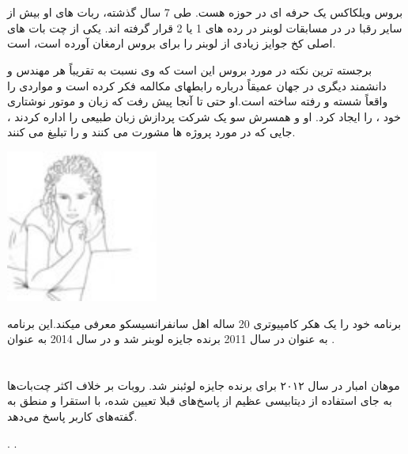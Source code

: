 \documentclass[18pt,a4paper]{report}
\begin{document}
 \section{}
 بروس ویلکاکس یک حرفه ای در حوزه  هست. طی 7 سال گذشته، ربات های او بیش از سایر رقبا در در مسابقات لوبنر در رده های 1 یا 2 قرار گرفته اند. یکی از چت بات های اصلی کخ جوایز زیادی از لوبنر را برای بروس ارمغان آورده است،  است.
 
 برجسته ترین نکته در مورد بروس این است که وی نسبت به تقریباً هر مهندس و دانشمند دیگری در جهان عمیقاً درباره رابطهای مکالمه فکر کرده است و مواردی را واقعاً شسته و رفته ساخته است.او حتی تا آنجا پیش رفت که زبان و موتور نوشتاری خود ،  را ایجاد کرد. او و همسرش سو یک شرکت پردازش زبان طبیعی  را اداره کردند ، جایی که در مورد پروژه ها مشورت می کنند و  را تبلیغ می کنند. 

 	\begin{center}
 		\includegraphics[width=5cm, height=5cm]{imgs/chatbot_rosette_d____10513.jpg}
 		\label{Rose image}

 	\end{center}

 
 برنامه  خود را یک هکر کامپیوتری 20 ساله اهل سانفرانسیسکو معرفی میکند.این برنامه به عنوان   در سال 2011 برنده جایزه لوبنر شد و در سال 2014 به عنوان  .
 
  
 \section{}
 موهان امبار در سال ۲۰۱۲ برای  برنده جایزه لوئبنر شد.
 روبات  بر خلاف اکثر چت‌بات‌ها به جای استفاده از دیتابیسی عظیم از پاسخ‌های قبلا تعیین شده، با استقرا و منطق به گفته‌های کاربر پاسخ می‌دهد.

\begin{thebibliography}{9}
	\latin
	
	


	.
	.
\end{thebibliography}
 	
 
 	
\end{document}
